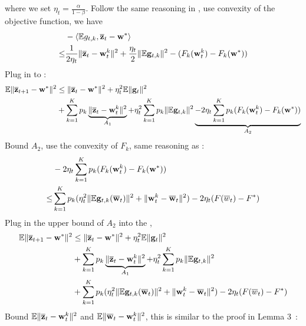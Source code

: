 where we set $\eta_t = \frac{\alpha}{1- \beta}$. Follow the same reasoning 
in \eq{\ref{eq:4}}, use convexity of the objective function, we have 
\begin{align}
   & - \left<\mathbb{E} g_{t,k}, \overline{{\mathbf{z}}}_{t} - {\mathbf{w}}^*\right> \\
	\leq & \frac{1}{2\eta_t} \|\overline{{\mathbf{z}}}_t - {\mathbf{w}}_t^k\|^2 + \frac{\eta_t}{2} \|\mathbb{E} {\mathbf{g}}_{t,k}\|^2 - (F_k({\mathbf{w}}_t^k) - F_k({\mathbf{w}}^*)) \label{eq:nagcvx2}
\end{align}
Plug in \eq{\ref{eq:nagcvx2}} to \eq{\ref{eq:nagcvx1}}:
\begin{align}
	\mathbb{E}\|\overline{{\mathbf{z}}}_{t+1} - {\mathbf{w}}^* \|^2 & \leq \| \overline{{\mathbf{z}}}_{t} - {\mathbf{w}}^*\|^2  +  \eta_t^2\mathbb{E}\|{\mathbf{g}}_t\|^2  \\
	&  + \sum_{k=1}^K p_k \underbrace{\|\overline{{\mathbf{z}}}_t - {\mathbf{w}}_t^k\|^2}_{A_1}  +\eta^2_t \sum_{k=1}^K p_k\|\mathbb{E} {\mathbf{g}}_{t,k}\|^2 \underbrace{- 2\eta_t\sum_{k=1}^K p_k(F_k({\mathbf{w}}_t^k) - F_k({\mathbf{w}}^*))}_{A_2} \label{eq:nagcvx3}
\end{align}
Bound $A_2$, use the convexity of $F_k$, same reasoning as \eq{\ref{eq:a24}}:
\begin{align*}
& -2\eta_t\sum_{k=1}^K p_k (F_k({\mathbf{w}}_t^k) - F_k({\mathbf{w}}^*)) \\
\leq &\sum_{k=1}^K p_k (\eta_t^2 \|\mathbb{E} {\mathbf{g}}_{t,k}(\overline{{\mathbf{w}}}_t) \|^2 +\|{\mathbf{w}}_t^k - \overline{{\mathbf{w}}}_t\|^2) -2\eta_t (F(\overline{w}_t) - F^*)
\end{align*}
Plug in the upper bound of $A_2$ into the \eq{\ref{eq:nagcvx3}}, 
\begin{align}
	\mathbb{E}\|\overline{{\mathbf{z}}}_{t+1} - {\mathbf{w}}^* \|^2 & \leq \| \overline{{\mathbf{z}}}_{t} - {\mathbf{w}}^*\|^2  +  \eta_t^2\mathbb{E}\|{\mathbf{g}}_t\|^2  \nonumber\\
	&  + \sum_{k=1}^K p_k \underbrace{\|\overline{{\mathbf{z}}}_t - {\mathbf{w}}_t^k\|^2}_{A_1}  +\eta^2_t \sum_{k=1}^K p_k\|\mathbb{E} {\mathbf{g}}_{t,k}\|^2 \nonumber \\
	& + \sum_{k=1}^K p_k (\eta_t^2 \|\mathbb{E} {\mathbf{g}}_{t,k}(\overline{{\mathbf{w}}}_t)\|^2 + \|{\mathbf{w}}_t^k - \overline{{\mathbf{w}}}_t\|^2) - 2\eta_t(F(\overline{w}_t) - F^*) 
	\label{eq:nagcvx4}
\end{align}
Bound $\mathbb{E}\|\overline{{\mathbf{z}}}_t - {\mathbf{w}}_t^k\|^2$ and $\mathbb{E} \|\overline{{\mathbf{w}}}_t- {\mathbf{w}}_t^k \|^2$, this is similar to the proof in Lemma 3~\cite{li2019convergence}: 

